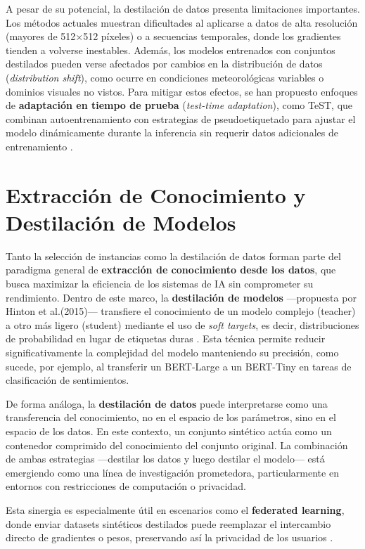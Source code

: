 A pesar de su potencial, la destilación de datos presenta limitaciones importantes.
Los métodos actuales muestran dificultades al aplicarse a datos de alta resolución (mayores de 512$\times$512 píxeles) o a secuencias temporales, donde los gradientes tienden a volverse inestables.
Además, los modelos entrenados con conjuntos destilados pueden verse afectados por cambios en la distribución de datos (\textit{distribution shift}), 
como ocurre en condiciones meteorológicas variables o dominios visuales no vistos. Para mitigar estos efectos, se han propuesto enfoques de \textbf{adaptación en tiempo de prueba} (\textit{test-time adaptation}),
como TeST, que combinan autoentrenamiento con estrategias de pseudoetiquetado para ajustar el modelo dinámicamente durante la inferencia sin requerir datos adicionales de entrenamiento \cite{https://arxiv.org/abs/2209.11459}.


\section{Extracción de Conocimiento y Destilación de Modelos}
Tanto la selección de instancias como la destilación de datos forman parte del paradigma general de \textbf{extracción de conocimiento desde los datos}, que busca maximizar la eficiencia de los sistemas de IA sin comprometer su rendimiento.
Dentro de este marco, la \textbf{destilación de modelos} —propuesta por Hinton et al.(2015)— transfiere el conocimiento de un modelo complejo (teacher) a otro más ligero (student) mediante el uso de \textit{soft targets}, es decir, distribuciones de probabilidad en lugar de etiquetas duras \cite{https://arxiv.org/abs/1503.02531}.
Esta técnica permite reducir significativamente la complejidad del modelo manteniendo su precisión, como sucede, por ejemplo, al transferir un BERT-Large a un BERT-Tiny en tareas de clasificación de sentimientos.

De forma análoga, la \textbf{destilación de datos} puede interpretarse como una transferencia del conocimiento, no en el espacio de los parámetros, sino en el espacio de los datos.
En este contexto, un conjunto sintético actúa como un contenedor comprimido del conocimiento del conjunto original.
La combinación de ambas estrategias —destilar los datos y luego destilar el modelo— está emergiendo como una línea de investigación prometedora, particularmente en entornos con restricciones de computación o privacidad.

Esta sinergia es especialmente útil en escenarios como el \textbf{federated learning}, donde enviar datasets sintéticos destilados puede reemplazar el intercambio directo de gradientes o pesos, preservando así la privacidad de los usuarios \cite{https://arxiv.org/abs/2009.07999, https://arxiv.org/abs/2502.13728}.

